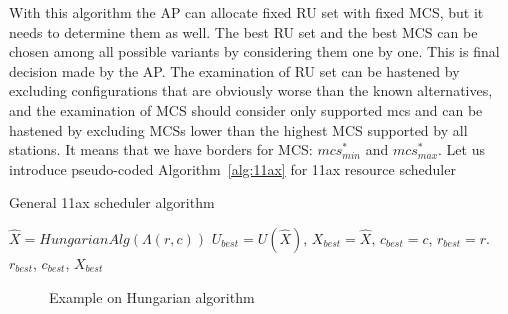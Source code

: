 With this algorithm the AP can allocate fixed RU set with fixed MCS, but it needs to determine them as well. The best RU set and the best MCS can be chosen among all possible variants by considering them one by one. This is final decision made by the AP. 
The examination of RU set can be hastened by excluding configurations that are obviously worse than the known alternatives, and the examination of MCS should consider only supported mcs and can be hastened by excluding MCSs lower than the highest MCS supported by all stations. It means that we have borders for MCS: $mcs^{*}_{min}$ and $mcs^{*}_{max}$. Let us introduce pseudo-coded Algorithm~\ref{alg:11ax} for 11ax resource scheduler 

\begin{algorithm}
	\caption{General 11ax scheduler algorithm}\label{alg:11ax}
	\begin{algorithmic}[1]
		\State $\hat X = HungarianAlg(\Lambda(r, c))$
		\State $U_{best} = U(\hat X)$,
		\State $X_{best} = \hat X$,
		\State $c_{best} = c$,
		\State $r_{best} = r$.
		\EndIf
		\EndFor
		\EndFor
		\State \Return $r_{best}$, $c_{best}$, $X_{best}$
		\EndProcedure
	\end{algorithmic}
\end{algorithm}

\begin{figure}[t]
\centering
\caption{\label{fig:matrixexm} Example on Hungarian algorithm}
\end{figure}

